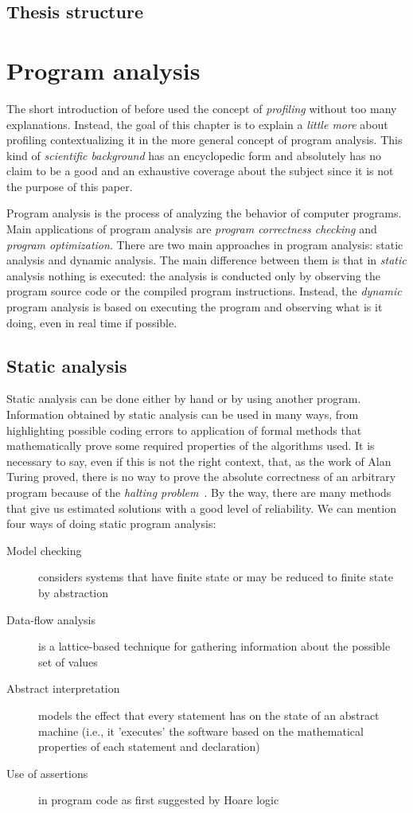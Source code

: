 \documentclass[a4paper,10pt]{report}
\begin{document}
\section{Thesis structure}

\chapter{Program analysis}
The short introduction of before used the concept of \emph{profiling} without
too many explanations.
Instead, the goal of this chapter is to explain a \emph{little more} about
profiling contextualizing it in the more general concept of program analysis.
This kind of \emph{scientific background} has an encyclopedic form and
absolutely has no claim to be a good and an exhaustive coverage about the
subject since it is not the purpose of this paper.

Program analysis is the process of analyzing the behavior of computer
programs. Main applications of program analysis are 
\emph{program correctness checking} and \emph{program optimization}.
There are two main approaches in program analysis: static analysis and dynamic analysis.
The main difference between them is that in \emph{static} analysis nothing is
executed: the analysis is conducted only by observing the program source code or
the compiled program instructions. Instead, the \emph{dynamic} program analysis
is based on executing the program and observing what is it doing, even in real
time if possible.

\section{Static analysis}

Static analysis can be done either by hand or by using another program.
Information obtained by static analysis can be used in many ways, from
highlighting possible coding errors to application of formal methods that
mathematically prove some required properties of the algorithms used. It is
necessary to say, even if this is not the right context, that, as the work of
Alan Turing proved, there is no way to prove the absolute
correctness of an arbitrary program because of the \emph{halting
problem}~\cite{Turing01}.
By the way, there are many methods that give us estimated solutions with a
good level of reliability. We can mention four ways of doing static program
analysis:


\begin{description}
\item[Model checking] considers systems that have finite state or may be reduced to finite state by abstraction
\item[Data-flow analysis] is a lattice-based technique for gathering information about the possible set of values
\item[Abstract interpretation] models the effect that every statement has on the
state of an abstract machine (i.e., it 'executes' the software based on the
mathematical properties of each statement and declaration)
\item[Use of assertions] in program code as first suggested by Hoare
logic~\cite{Hoare01}
\end{description}
\end{document}
